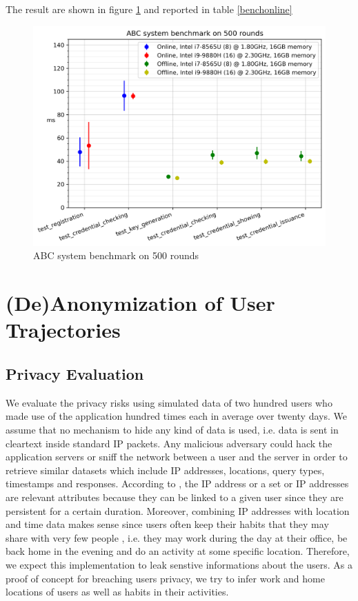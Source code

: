 \documentclass[10pt,conference,compsocconf]{IEEEtran}
\begin{document}
The result are shown in figure \ref{bench_fig}
and reported in table \ref{benchonline}
\begin{figure}
    \includegraphics[width=\columnwidth]{ABC_system_benchmark_on_500_rounds.png}
    \caption{ABC system benchmark on 500 rounds}
    \label{bench_fig}
\end{figure}


\section{(De)Anonymization of User Trajectories}

\subsection{Privacy Evaluation}
We evaluate the privacy risks using simulated data of two hundred users who made use of the application hundred times each in average over twenty days. We assume that no mechanism to hide any kind of data is used, i.e. data is sent in cleartext inside standard IP packets. Any malicious adversary could hack the application servers or sniff the network between a user and the server in order to retrieve similar datasets which include IP addresses, locations, query types, timestamps and responses. According to \cite{dont}, the IP address or a set or IP addresses are relevant attributes because they can be linked to a given user since they are persistent for a certain duration. Moreover, combining IP addresses with location and time data makes sense since users often keep their habits that they may share with very few people \cite{on}, i.e. they may work during the day at their office, be back home in the evening and do an activity at some specific location. Therefore, we expect this implementation to leak senstive informations about the users. As a proof of concept for breaching users privacy, we try to infer work and home locations of users as well as habits in their activities.
\end{document}
